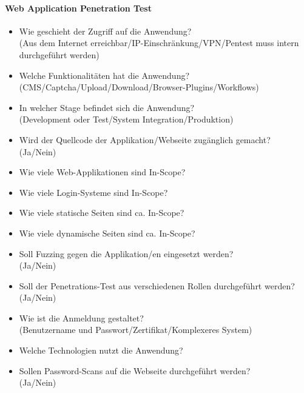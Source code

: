 \paragraph{Web Application Penetration Test}
\begin{itemize}
	\item Wie geschieht der Zugriff auf die Anwendung?\\
	(Aus dem Internet erreichbar/IP-Einschränkung/VPN/Pentest muss intern durchgeführt werden)
	\item Welche Funktionalitäten hat die Anwendung?\\
	(CMS/Captcha/Upload/Download/Browser-Plugins/Workflows)
	\item In welcher Stage befindet sich die Anwendung?\\
	(Development oder Test/System Integration/Produktion)
	\item Wird der Quellcode der Applikation/Webseite zugänglich gemacht?\\
	(Ja/Nein)
	\item Wie viele Web-Applikationen sind In-Scope?
	\item Wie viele Login-Systeme sind In-Scope?
	\item Wie viele statische Seiten sind ca. In-Scope?
	\item Wie viele dynamische Seiten sind ca. In-Scope?
	\item Soll Fuzzing gegen die Applikation/en eingesetzt werden?\\
	(Ja/Nein)
	\item Soll der Penetrations-Test aus verschiedenen Rollen durchgeführt werden?\\
	(Ja/Nein)
	\item  Wie ist die Anmeldung gestaltet?\\
	(Benutzername und Passwort/Zertifikat/Komplexeres System)
	\item Welche Technologien nutzt die Anwendung?
	\item Sollen Password-Scans auf die Webseite durchgeführt werden?\\
	(Ja/Nein)
\end{itemize}

